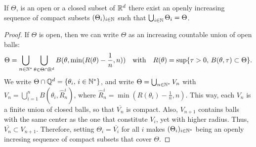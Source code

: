 % 
\begin{prop}
     If $\Theta$, is an open or a closed subset of $\mathbb{R}^d$ there exist an openly increasing sequence of compact subsets $(\Theta_i)_{i\in\mathbb{N}}$ such that $\bigcup_{i\in\mathbb{N}}\Theta_i=\Theta$.
\end{prop}

\begin{proof}
    If $\Theta$ is open,
    then we can write $\Theta$ as an increasing countable union of open balls: %
        \begin{equation}
            \Theta = \bigcup_{n\in\mathbb{N}^\ast}\bigcup_{\theta\in\Theta\cap\mathbb{R}^d} B(\theta, \min(R(\theta)-\frac{1}{n},n) ) \quad \text{with} \quad R(\theta) = \sup\{\tau>0,\,B(\theta,\tau)\subset\Theta\}. 
        \end{equation}
    We write $\Theta\cap\mathbb{Q}^d=\{\theta_i,\,i\in\mathbb{N}^\ast\}$, and write $\Theta=\bigcup_{n\in\mathbb{N}^\ast}V_n$ with $V_n=\bigcup_{i=1}^nB(\theta_i,\hat R^i_n)$, where $\hat R^i_n =\min(R(\theta_i)-\frac{1}{n},n)$. This way, each $V_n$ is a finite union of closed balls, so that $\overline{V_n}$ is compact. Also, $V_{n+1}$ contains balls with the same center as the one that constitute $V_i$, yet with higher radius. Thus, $\overline{V_n}\subset V_{n+1}$. Therefore, setting $\Theta_i=\overline{V_i}$ for all $i$ makes $(\Theta_i)_{i\in\mathbb{N}^\ast}$ being an openly incresing sequence of compact subsets that cover $\Theta$.


\end{proof}
